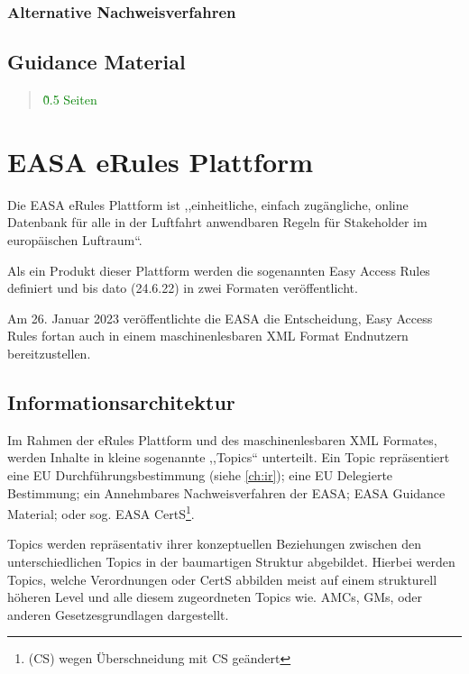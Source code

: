     \subsubsection{Alternative Nachweisverfahren}
        
        

\subsection{Guidance Material}

\begin{quote}
\textcolor{green}{\~0.5 Seiten}
\end{quote}
        \pagebreak
    \section{EASA eRules Plattform}

    Die \ac{EASA} eRules Plattform ist ,,einheitliche, einfach zugängliche, online Datenbank für alle in der Luftfahrt anwendbaren Regeln für Stakeholder im europäischen Luftraum``.
    \cite[5]{easa_xml_doc}

    Als ein Produkt dieser Plattform werden die sogenannten Easy Access Rules definiert und bis dato (24.6.22) in zwei Formaten veröffentlicht. 

    
Am 26. Januar 2023 veröffentlichte die EASA die Entscheidung, Easy Access Rules fortan auch in einem maschinenlesbaren XML Format Endnutzern bereitzustellen. \cite{easa_xml_publication}


\subsection{Informationsarchitektur}
\label{ch:easa_arch}

    Im Rahmen der eRules Plattform und des maschinenlesbaren \ac{XML} Formates, werden Inhalte in kleine sogenannte ,,Topics`` unterteilt.
    Ein Topic repräsentiert eine \ac{EU} Durchführungsbestimmung (siehe \ref{ch:ir}); eine \ac{EU} Delegierte Bestimmung; ein Annehmbares Nachweisverfahren der \ac{EASA}; \ac{EASA} Guidance Material; oder sog. \ac{EASA} \acf{CertS}\footnote{(CS) wegen Überschneidung mit \acf{CS} geändert}. \cite[S. 5f]{easa_xml_doc}
    
Topics werden repräsentativ ihrer konzeptuellen Beziehungen zwischen den unterschiedlichen Topics in der baumartigen Struktur abgebildet.
Hierbei werden Topics, welche Verordnungen oder \ac{CertS} abbilden meist auf einem strukturell höheren Level und alle diesem zugeordneten Topics wie. \acsp{AMC}, \acsp{GM}, oder anderen Gesetzesgrundlagen dargestellt.



